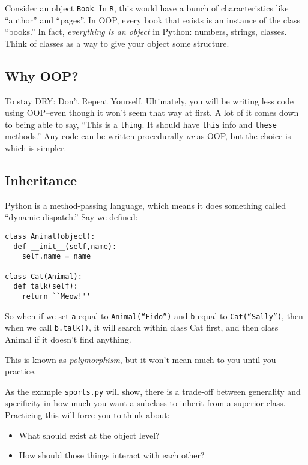 \documentclass[12pt,letter]{article}
\begin{document}
Consider an object \texttt{Book}. In \texttt{R}, this would have a bunch of
characteristics like ``author'' and ``pages''. In OOP, every book
that exists is an instance of the class ``books.'' In fact,
\emph{everything is an object} in Python: numbers, strings,
classes. Think of classes as a way to give your object some
structure. 


\subsection{Why OOP?}
To stay DRY: Don't Repeat Yourself. Ultimately, you will be writing
less code using OOP--even though it won't seem that way at first. A
lot of it comes down to being able to say, ``This is a
\texttt{thing}. It should have \texttt{this} info and \texttt{these}
methods.'' Any code can be written procedurally \emph{or} as OOP, but
the choice is which is simpler. 

\subsection{Inheritance} %

Python is a method-passing language, which means it does something
called ``dynamic dispatch.'' Say we defined:

\begin{verbatim} 
class Animal(object): 
  def __init__(self,name): 
    self.name = name

class Cat(Animal): 
  def talk(self): 
    return ``Meow!''
\end{verbatim}


So when if we set \texttt{a} equal to \texttt{Animal(``Fido'')} and
\texttt{b} equal to \texttt{Cat(``Sally'')}, then when we call
\texttt{b.talk()}, it will search within class Cat first, and then
class Animal if it doesn't find anything. %

This is known as \emph{polymorphism}, but it won't mean much to you
until you practice.

As the example \texttt{sports.py} will show, there is a trade-off
between generality and specificity in how much you want a subclass to
inherit from a superior class. Practicing this will force you to think
about:
\begin{itemize}
\item What should exist at the object level?
\item How should those things interact with each other?
\end{itemize}
\end{document}
